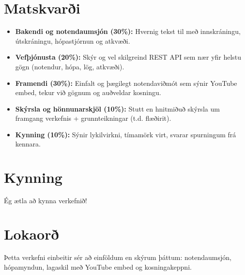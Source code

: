 \documentclass{article}
\begin{document}
\section{Matskvarði}
\begin{itemize}
    \item \textbf{Bakendi og notendaumsjón (30\%):}  
    Hvernig tekst til með innskráningu, útskráningu, hópastjórnun og atkvæði.
    \item \textbf{Vefþjónusta (20\%):}  
    Skýr og vel skilgreind REST API sem nær yfir helstu gögn (notendur, hópa, lög, atkvæði).
    \item \textbf{Framendi (30\%):}  
    Einfalt og þægilegt notendaviðmót sem sýnir YouTube embed, tekur við gögnum og auðveldar kosningu.
    \item \textbf{Skýrsla og hönnunarskjöl (10\%):}  
    Stutt en hnitmiðuð skýrsla um framgang verkefnis + grunnteikningar (t.d. flæðirit).
    \item \textbf{Kynning (10\%):}  
    Sýnir lykilvirkni, tímamörk virt, svarar spurningum frá kennara.
\end{itemize}

\section{Kynning}
Ég ætla að kynna verkefnið!

\section{Lokaorð}
Þetta verkefni einbeitir sér að einföldum en skýrum þáttum: notendaumsjón, hópamyndun, lagaskil með YouTube embed og kosningakeppni. 
\end{document}
